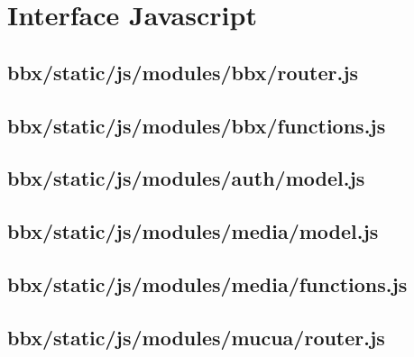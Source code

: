 %

\section{Interface Javascript}
\subsection{bbx/static/js/modules/bbx/router.js}


\subsection{bbx/static/js/modules/bbx/functions.js}


\subsection{bbx/static/js/modules/auth/model.js}


\subsection{bbx/static/js/modules/media/model.js}


\subsection{bbx/static/js/modules/media/functions.js}


\subsection{bbx/static/js/modules/mucua/router.js}


